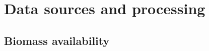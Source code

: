\renewcommand{\thetable}{S\arabic{table}}
\setcounter{table}{0}
\renewcommand{\thefigure}{S\arabic{figure}}
\setcounter{figure}{0}

\section{Data sources and processing}

\subsection{Biomass availability}


